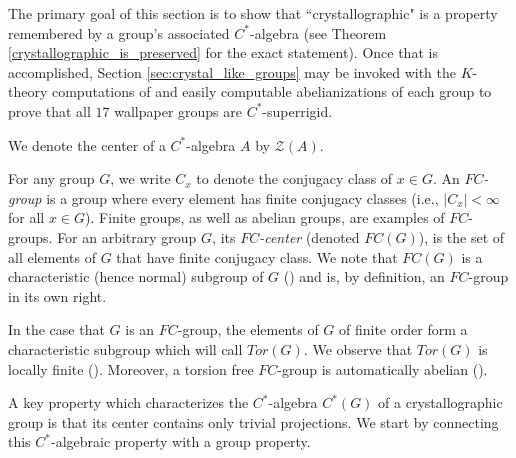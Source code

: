 \documentclass[11pt, twoside]{amsart}
\theoremstyle{definition}
\newcommand{\ZZ}{\mathcal{Z}}
\begin{document}
The primary goal of this section is to show that ``crystallographic" is a property remembered by a group's associated $C^*$-algebra (see Theorem \ref{crystallographic_is_preserved} for the exact statement). Once that is accomplished, Section \ref{sec:crystal_like_groups} may be invoked with the $K$-theory computations of \cite{yang1998crossed} and easily computable abelianizations of each group to prove that all $17$ wallpaper groups are $C^*$-superrigid.

We denote the center of a $C^*$-algebra $A$ by $\ZZ(A)$. 

For any group $G$, we write $C_x$ to denote the conjugacy class of $x\in G$. An \emph{$FC$-group} is a group where every element has finite conjugacy classes (i.e., $|C_x|<\infty$ for all $x\in G$). Finite groups, as well as abelian groups, are examples of $FC$-groups. For an arbitrary group $G$, its \emph{$FC$-center} (denoted $FC(G)$), is the set of all elements of $G$ that have finite conjugacy class. We note that $FC(G)$ is a characteristic (hence normal) subgroup of $G$ (\cite[14.5.5]{robinson_group_theory_book}) and is, by definition, an $FC$-group in its own right.

In the case that $G$ is an $FC$-group, the elements of $G$ of finite order form a characteristic subgroup which will call $Tor(G)$. We observe that $Tor(G)$ is locally finite (\cite[14.5.7]{robinson_group_theory_book}). Moreover, a torsion free $FC$-group is automatically abelian (\cite[Prop. 2.5]{tf_2_step_c*_superrigid}).

A key property which characterizes the $C^*$-algebra $C^*(G)$ of a crystallographic group is that its center contains only trivial projections. We start by connecting this $C^*$-algebraic property with a group property.
\end{document}
